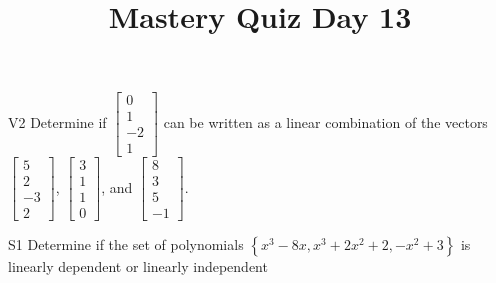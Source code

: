 \documentclass{sbgLAquiz}
\title{Mastery Quiz Day 13 }
\begin{document}
\begin{problem}{V2}
Determine if $\begin{bmatrix} 0 \\ 1 \\ -2 \\ 1 \end{bmatrix}$ can be written as a linear combination of the vectors $\begin{bmatrix} 5 \\ 2 \\ -3 \\ 2 \end{bmatrix}$, $\begin{bmatrix} 3 \\ 1 \\ 1 \\ 0 \end{bmatrix}$, and $\begin{bmatrix} 8 \\ 3 \\ 5 \\ -1 \end{bmatrix}$.
\end{problem}

\begin{problem}{S1}
Determine if the set of polynomials $\left\{ x^3-8x, x^3+2x^2+2, -x^2+3\right\}$ is  linearly dependent or linearly independent
\end{problem}
\end{document}
